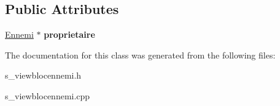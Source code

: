 \subsection*{Public Attributes}
\begin{DoxyCompactItemize}
\item 
\hypertarget{class_s___view_bloc_ennemi_a85aabc73d2414af643c1d6e65a3384f5}{}\hyperlink{class_ennemi}{Ennemi} $\ast$ {\bfseries proprietaire}\label{class_s___view_bloc_ennemi_a85aabc73d2414af643c1d6e65a3384f5}

\end{DoxyCompactItemize}


The documentation for this class was generated from the following files\+:\begin{DoxyCompactItemize}
\item 
s\+\_\+viewblocennemi.\+h\item 
s\+\_\+viewblocennemi.\+cpp\end{DoxyCompactItemize}
